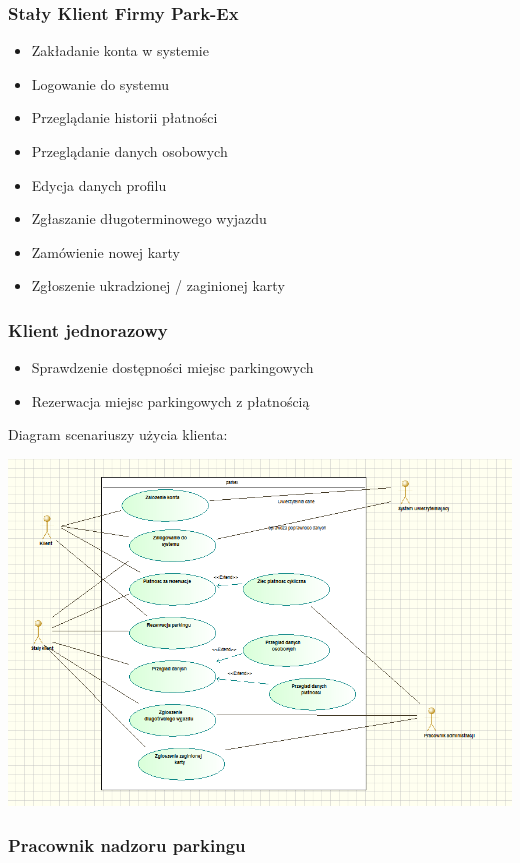 \documentclass[paper=a4, fontsize=11pt]{scrartcl} %
\begin{document}
\subsubsection{Stały Klient Firmy Park-Ex}

\begin{itemize}
\item Zakładanie konta w systemie
\item Logowanie do systemu
\item Przeglądanie historii płatności
\item Przeglądanie danych osobowych
\item Edycja danych profilu
\item Zgłaszanie długoterminowego wyjazdu
\item Zamówienie nowej karty
\item Zgłoszenie ukradzionej / zaginionej karty
\end{itemize}

\subsubsection{Klient jednorazowy}

\begin{itemize}
\item Sprawdzenie dostępności miejsc parkingowych
\item Rezerwacja miejsc parkingowych z płatnością
\end{itemize}


Diagram scenariuszy użycia klienta:

\includegraphics[scale=0.7]{kli}

\subsubsection{Pracownik nadzoru parkingu}
\end{document}
